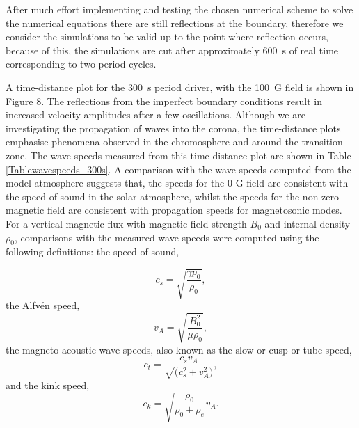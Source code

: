 \documentclass[physics,article,submit,pdftex,moreauthors]{Definitions/mdpi}
\begin{document}
After much  effort implementing and testing  the chosen numerical scheme to solve the numerical equations there are still reflections at the boundary, therefore we consider the simulations to be valid up to the point where reflection occurs, because of this, the simulations are cut after approximately 600~s of real time corresponding to two period cycles.

A  time-distance plot for the 300~s period driver, with the 100~G field is shown in Figure 8. The reflections from the imperfect boundary conditions result in increased velocity amplitudes after a few oscillations. Although we are investigating the propagation of waves into the corona, the time-distance plots emphasise phenomena observed in the chromosphere and around the transition zone.  The wave speeds measured from this time-distance plot are shown in Table \ref{Tablewavespeeds_300s}. A comparison with the wave speeds computed from the model atmosphere suggests that, the speeds for the 0 G field are consistent with the speed of sound in the solar atmosphere, whilst the speeds for the non-zero magnetic field are consistent with propagation speeds for magnetosonic modes.
For a  vertical magnetic flux %
with magnetic field strength $B_{0}$ and internal density $\rho_{0}$, comparisons with the measured wave speeds were computed using the following definitions:
the speed of sound,

\begin{equation}
 c_{s}  =    \sqrt{\frac{\gamma p_0}{\rho_0}}, 
\label{e10}
\end{equation}
the Alfvén speed,
\begin{equation}
 v_{A}  =    \sqrt{\frac{B_{0}^{2}}{\mu\rho_{0}}},  
\label{e11}
\end{equation}
the magneto-acoustic wave speeds, also known as  the slow or cusp or tube speed,
\begin{equation}
 c_{t}  =    \frac{c_s v_A}{\sqrt(c_s^2+v_A^2)}, 
\label{e12}
\end{equation}
and the kink speed,
\begin{equation}
 c_{k}  =    \sqrt{\frac{\rho_0}{\rho_0+\rho_e}}v_A.
\label{e12}
\end{equation}
\end{document}
